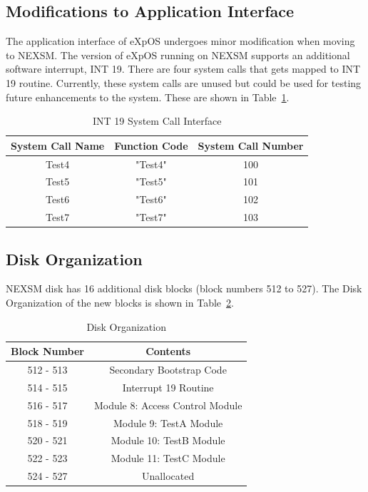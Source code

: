 \documentclass[12pt]{report}
\begin{document}
\subsection{Modifications to Application Interface}
The application interface of eXpOS undergoes minor modification when moving to NEXSM. The version of eXpOS running on NEXSM supports an additional software interrupt, INT 19. There are four system calls that gets mapped to INT 19 routine. Currently, these system calls are unused but could be used for testing future enhancements to the system. These are shown in Table~\ref{syscalls}.

\begin{table}[h!]
    \centering
    \begin{tabular}{|c|c|c|}
        \hline
        \textbf{System Call Name} & \textbf{Function Code} & \textbf{System Call Number} \\ [0.5ex]
        \hline
        Test4 & "Test4" & 100 \\
        \hline
        Test5 & "Test5" & 101 \\
        \hline
        Test6 & "Test6" & 102 \\
        \hline
        Test7 & "Test7" & 103 \\
        \hline
    \end{tabular}
    \caption{INT 19 System Call Interface}
    \label{syscalls}
\end{table}

\subsection{Disk Organization}
NEXSM disk has 16 additional disk blocks (block numbers 512 to 527). The Disk Organization of the new blocks is shown in Table~\ref{diskorg}.

\begin{table}[h!]
    \centering
    \begin{tabular}{|c|c|}
        \hline
        \textbf{Block Number} & \textbf{Contents} \\ [0.5ex]
        \hline
        512 - 513 & Secondary Bootstrap Code \\
        \hline
        514 - 515 & Interrupt 19 Routine \\
        \hline
        516 - 517 & Module 8: Access Control Module \\
        \hline
        518 - 519 & Module 9: TestA Module \\
        \hline
        520 - 521 & Module 10: TestB Module \\
        \hline
        522 - 523 & Module 11: TestC Module \\
        \hline
        524 - 527 & Unallocated \\
        \hline
    \end{tabular}
    \caption{Disk Organization}
    \label{diskorg}
\end{table}
\end{document}
